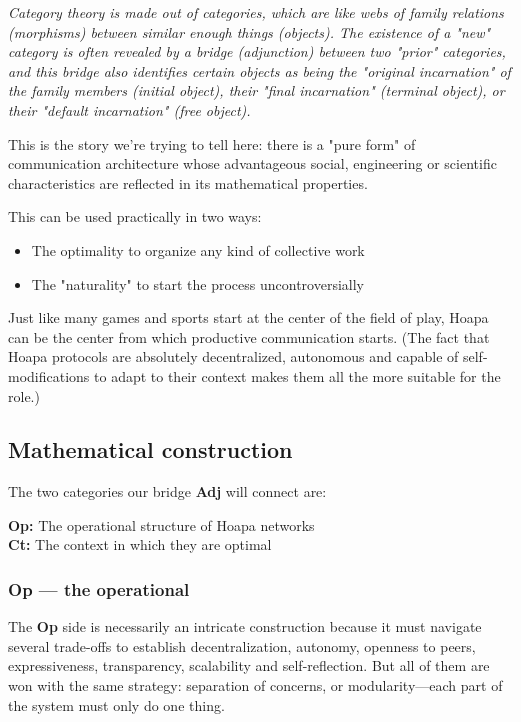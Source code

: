 \documentclass[11pt]{article}
\begin{document}
\emph{Category theory is made out of categories, which are like webs of family relations (morphisms) between similar enough things (objects). The existence of a "new" category is often revealed by a bridge (adjunction) between two "prior" categories, and this bridge also identifies certain objects as being the "original incarnation" of the family members (initial object), their "final incarnation" (terminal object), or their "default incarnation" (free object).}

This is the story we're trying to tell here: there is a "pure form" of communication architecture whose advantageous social, engineering or scientific characteristics are reflected in its mathematical properties.

This can be used practically in two ways:

\begin{itemize}

\item The optimality to organize any kind of collective work

\item The "naturality" to start the process uncontroversially

\end{itemize}

Just like many games and sports start at the center of the field of play, Hoapa can be the center from which productive communication starts. (The fact that Hoapa protocols are absolutely decentralized, autonomous and capable of self-modifications to adapt to their context makes them all the more suitable for the role.)

\subsection{Mathematical construction}

The two categories our bridge \textbf{Adj} will connect are:

\textbf{Op:} The operational structure of Hoapa networks \\ \textbf{Ct:} The context in which they are optimal

\subsubsection{Op --- the operational}

The \textbf{Op} side is necessarily an intricate construction because it must navigate several trade-offs to establish decentralization, autonomy, openness to peers, expressiveness, transparency, scalability and self-reflection. But all of them are won with the same strategy: separation of concerns, or modularity---each part of the system must only do one thing.
\end{document}
